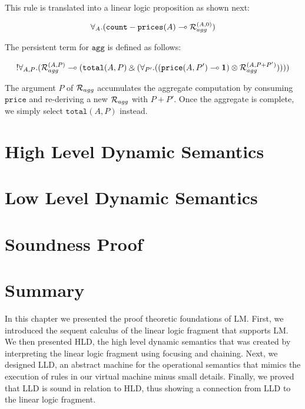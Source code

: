 This rule is translated into a linear logic proposition as shown next:

\begin{align}
\forall_{A}. (\mathtt{count-prices}(A) \multimap \mathcal{R}_{agg}^{(A, 0)})
\end{align}

The persistent term for $\mathtt{agg}$ is defined as follows:

\begin{align}
{!} \forall_{A, P}. (\mathcal{R}_{agg}^{(A, P)} \multimap (\mathtt{total}(A, P)
            \mathbin{\binampersand} (\forall_{P'}.
               ((\mathtt{price}(A, P') \multimap \mathbf{1}) \otimes \mathcal{R}_{agg}^{(A, P +
                P')}))))
\end{align}

The argument $P$ of $\mathcal{R}_{agg}$ accumulates the aggregate computation by
consuming $\mathtt{price}$ and re-deriving a new $\mathcal{R}_{agg}$ with $P +
P'$. Once the aggregate is complete, we simply select $\mathtt{total}(A, P)$
instead.

\section{High Level Dynamic Semantics}



\section{Low Level Dynamic Semantics}

\section{Soundness Proof}

\section{Summary}

In this chapter we presented the proof theoretic foundations of LM.  First, we
introduced the sequent calculus of the linear logic fragment that supports LM. We then
presented HLD, the high level dynamic semantics that was created by interpreting
the linear logic fragment using focusing and chaining. Next, we designed LLD,
an abstract machine for the operational semantics that mimics the execution of
rules in our virtual machine minus small details.  Finally, we proved that LLD is sound
in relation to HLD, thus showing a connection from LLD to the linear logic
fragment.

